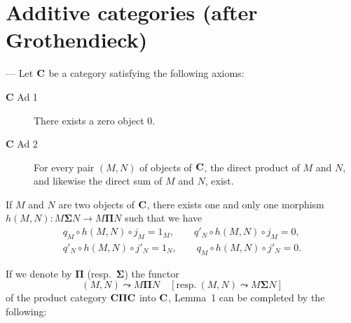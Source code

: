 %
%

\section{Additive categories (after Grothendieck)}
--- Let $\mathbf{C}$ be a category satisfying the following axioms:

\begin{description}
\item[$\mathbf{C}$ Ad 1] There exists a zero object $0$.

\item[$\mathbf{C}$ Ad 2] For every pair $(M,N)$ of objects of $\mathbf{C}$, the
direct product of $M$ and $N$, and likewise the direct sum of $M$ and $N$,
exist.
\end{description}

\begin{lemma}
If $M$ and $N$ are two objects of $\mathbf{C}$, there exists one and only one
morphism $h(M,N)\colon M\boldsymbol{\Sigma}N\to M\boldsymbol{\Pi}N$ such
that we have
\[
\begin{gathered}
  q_M\circ h(M,N)\circ j_M = 1_M, \qquad
  q'_N\circ h(M,N)\circ j_M = 0,\\
  q'_N\circ h(M,N)\circ j'_N = 1_N, \qquad
  q_M\circ h(M,N)\circ j'_N = 0.
\end{gathered}
\]
\end{lemma}

If we denote by $\boldsymbol{\Pi}$ (resp.\ $\boldsymbol{\Sigma}$) the functor
\[
  (M,N)\leadsto M\boldsymbol{\Pi}N
  \quad[\text{resp.}\ (M,N)\leadsto M\boldsymbol{\Sigma}N]
\]
of the product category $\mathbf{C}\boldsymbol{\Pi}\mathbf{C}$ into $\mathbf{C}$, Lemma~1 can be
completed by the following:

